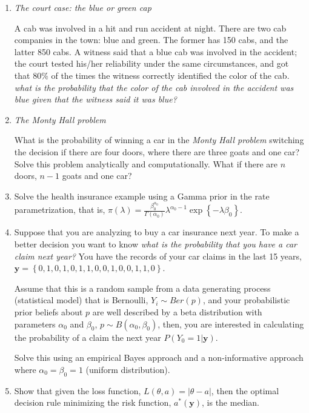 \begin{enumerate}
	\item \textit{The court case: the blue or green cap}
	
	A cab was involved in a hit and run accident at night. There are two cab companies in the town: blue and green. The former has 150 cabs, and the latter 850 cabs. A witness said that a blue cab was involved in the accident; the court tested his/her reliability under the same circumstances, and got that 80\% of the times the witness correctly identified the color of the cab. \textit{what is the probability that the color of the cab involved in the accident was blue given that the witness said it was blue?}
	
	\item \textit{The Monty Hall problem}
	
	What is the probability of winning a car in the \textit{Monty Hall problem} switching the decision if there are four doors, where there are three goats and one car? Solve this problem analytically and computationally.  What if there are $n$ doors, $n-1$ goats and one car?
	
	\item Solve the health insurance example using a Gamma prior in the rate parametrization, that is, $\pi(\lambda)=\frac{\beta_0^{\alpha_0}}{\Gamma(\alpha_0)}\lambda^{\alpha_0-1}\exp\left\{-\lambda\beta_0\right\}$.  
	
	\item Suppose that you are analyzing to buy a car insurance next year. To make a better decision you want to know \textit{what is the probability that you have a car claim next year?} You have the records of your car claims in the last 15 years, $\mathbf{y}=\left\{0, 1, 0, 1, 0, 1, 1, 0, 0, 1, 0, 0, 1, 1, 0\right\}$.
	
	Assume that this is a random sample from a data generating process (statistical model) that is Bernoulli, $Y_i\sim Ber(p)$, and your probabilistic prior beliefs about $p$ are well described by a beta distribution with parameters $\alpha_0$ and $\beta_0$, $p\sim B(\alpha_0, \beta_0)$, then, you are interested in calculating the probability of a claim the next year $P(Y_0 = 1|\mathbf{y})$.
	
	Solve this using an empirical Bayes approach and a non-informative approach where $\alpha_0=\beta_0=1$ (uniform distribution). 
	
	\item Show that given the loss function, $L({\theta},a)=|{\theta}-a|$, then the optimal decision rule minimizing the risk function, $a^*(\mathbf{y})$, is the median.

\end{enumerate}



